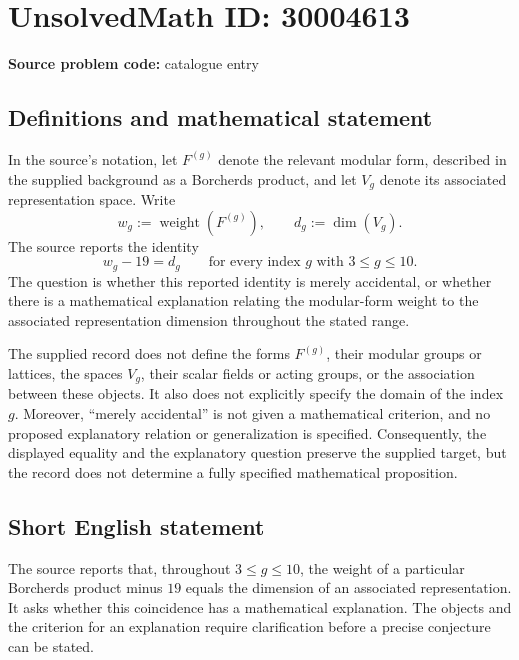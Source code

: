 \documentclass[11pt]{article}
\begin{document}
\section*{UnsolvedMath ID: 30004613}
\textbf{Source problem code:} catalogue entry
\subsection{Definitions and mathematical statement}
In the source's notation, let \(F^{(g)}\) denote the relevant modular form, described in the supplied background as a Borcherds product, and let \(V_g\) denote its associated representation space. Write
\[
w_g:=\operatorname{weight}(F^{(g)}),\qquad d_g:=\dim(V_g).
\]
The source reports the identity
\[
w_g-19=d_g\qquad\text{for every index }g\text{ with }3\leq g\leq10.
\]
The question is whether this reported identity is merely accidental, or whether there is a mathematical explanation relating the modular-form weight to the associated representation dimension throughout the stated range.

The supplied record does not define the forms \(F^{(g)}\), their modular groups or lattices, the spaces \(V_g\), their scalar fields or acting groups, or the association between these objects. It also does not explicitly specify the domain of the index \(g\). Moreover, ``merely accidental'' is not given a mathematical criterion, and no proposed explanatory relation or generalization is specified. Consequently, the displayed equality and the explanatory question preserve the supplied target, but the record does not determine a fully specified mathematical proposition.
\subsection{Short English statement}
The source reports that, throughout \(3\leq g\leq10\), the weight of a particular Borcherds product minus \(19\) equals the dimension of an associated representation. It asks whether this coincidence has a mathematical explanation. The objects and the criterion for an explanation require clarification before a precise conjecture can be stated.
\end{document}
